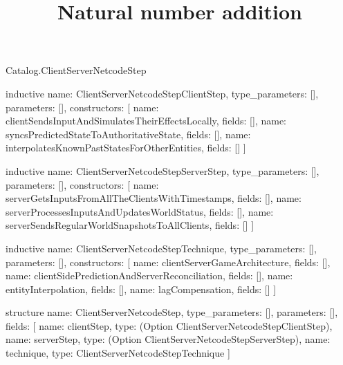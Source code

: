 \begin{lexlean}{Catalog.ClientServerNetcodeStep}
\title{Natural number addition}
\begin{semanticmodule}
inductive{
  name: ClientServerNetcodeStepClientStep,
  type_parameters: [],
  parameters: [],
  constructors: [
    {name: clientSendsInputAndSimulatesTheirEffectsLocally, fields: []},
    {name: syncsPredictedStateToAuthoritativeState, fields: []},
    {name: interpolatesKnownPastStatesForOtherEntities, fields: []}
  ]
}

inductive{
  name: ClientServerNetcodeStepServerStep,
  type_parameters: [],
  parameters: [],
  constructors: [
    {name: serverGetsInputsFromAllTheClientsWithTimestamps, fields: []},
    {name: serverProcessesInputsAndUpdatesWorldStatus, fields: []},
    {name: serverSendsRegularWorldSnapshotsToAllClients, fields: []}
  ]
}

inductive{
  name: ClientServerNetcodeStepTechnique,
  type_parameters: [],
  parameters: [],
  constructors: [
    {name: clientServerGameArchitecture, fields: []},
    {name: clientSidePredictionAndServerReconciliation, fields: []},
    {name: entityInterpolation, fields: []},
    {name: lagCompensation, fields: []}
  ]
}

structure{
  name: ClientServerNetcodeStep,
  type_parameters: [],
  parameters: [],
  fields: [
    {name: clientStep, type: (Option ClientServerNetcodeStepClientStep)},
    {name: serverStep, type: (Option ClientServerNetcodeStepServerStep)},
    {name: technique, type: ClientServerNetcodeStepTechnique}
  ]
}
\end{semanticmodule}
\end{lexlean}
